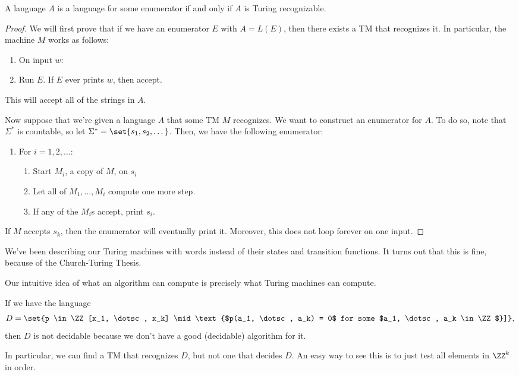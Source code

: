 \documentclass{standalone}
\begin{document}
\begin{proposition}
	A language \(A\) is a language for some enumerator if and only if \(A\) is Turing recognizable.
\end{proposition}
\begin{proof}
	We will first prove that if we have an enumerator \(E\) with \(A = L(E)\), then there exists a \textsf{TM} that recognizes it. In particular, the machine \(M\) works as follows:
	\begin{enumerate}[nosep, start=0]
		\item On input \(w\):
		\item Run \(E\). If \(E\) ever prints \(w\), then accept.
	\end{enumerate}
	This will accept all of the strings in \(A\).

	Now suppose that we're given a language \(A\) that some \textsf{TM} \(M\) recognizes. We want to construct an enumerator for \(A\). To do so, note that \(\Sigma^*\) is countable, so let \(\Sigma^* = \set{s_1, s_2, \dots}\). Then, we have the following enumerator:
	\begin{enumerate}[nosep]
		\item For \(i = 1, 2, \dots\):
		\begin{enumerate}[nosep]
			\item Start \(M_i\), a copy of \(M\), on \(s_i\)
			\item Let all of \(M_1, \dots, M_i\) compute one more step.
			\item If any of the \(M_i\)s accept, print \(s_i\).
		\end{enumerate}
	\end{enumerate}
	If \(M\) accepts \(s_k\), then the enumerator will eventually print it. Moreover, this does not loop forever on one input.
\end{proof}

We've been describing our Turing machines with words instead of their states and transition functions. It turns out that this is fine, because of the Church-Turing Thesis.
\begin{claim}
	Our intuitive idea of what an algorithm can compute is precisely what Turing machines can compute.
\end{claim}

\begin{example}
	If we have the language
	\[
		D = \set{p \in \ZZ[x_1, \dotsc, x_k] \mid \text{$p(a_1, \dotsc, a_k) = 0$ for some $a_1, \dotsc, a_k \in \ZZ$}]},
	\]
	then \(D\) is not decidable because we don't have a good (decidable) algorithm for it.
\end{example}
In particular, we can find a \textsf{TM} that recognizes \(D\), but not one that decides \(D\). An easy way to see this is to just test all elements in \(\ZZ^k\) in order.
\end{document}
